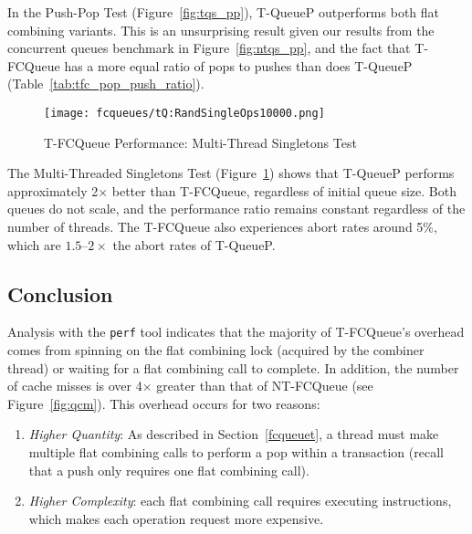 In the Push-Pop Test (Figure~\ref{fig:tqs_pp}), T-QueueP outperforms both flat combining variants. This is an unsurprising result given our results from the concurrent queues benchmark in Figure~\ref{fig:ntqs_pp}, and the fact that T-FCQueue has a more equal ratio of pops to pushes than does T-QueueP (Table~\ref{tab:tfc_pop_push_ratio}). 

\begin{figure}[t!]
    \centering
   	\begin{minipage}{0.9\textwidth}
        {\texttt{[image: fcqueues/tQ:RandSingleOps10000.png]}}
	\end{minipage}
    \caption{T-FCQueue Performance: Multi-Thread Singletons Test}
    \label{fig:tqs}
\end{figure}

The Multi-Threaded Singletons Test (Figure~\ref{fig:tqs}) shows that T-QueueP performs approximately 2$\times$ better than T-FCQueue, regardless of initial queue size. Both queues do not scale, and the performance ratio remains constant regardless of the number of threads. The T-FCQueue also experiences abort rates around 5\%, which are $1.5$--$2\times$ the abort rates of T-QueueP.

\vspace{12pt}
\noindent{}

\subsection{Conclusion}
Analysis with the \texttt{perf} tool indicates that the majority of T-FCQueue's overhead comes from spinning on the flat combining lock (acquired by the combiner thread) or waiting for a flat combining call to complete. In addition, the number of cache misses is over 4$\times$ greater than that of NT-FCQueue (see Figure~\ref{fig:qcm}). This overhead occurs for two reasons:
\begin{enumerate}
    \item \emph{Higher Quantity}: As described in Section~\ref{fcqueuet}, a thread must make multiple flat combining calls to perform a pop within a transaction (recall that a push only requires one flat combining call).
\item \emph{Higher Complexity}: each flat combining call requires executing instructions, which makes each operation request more expensive.
\end{enumerate}

